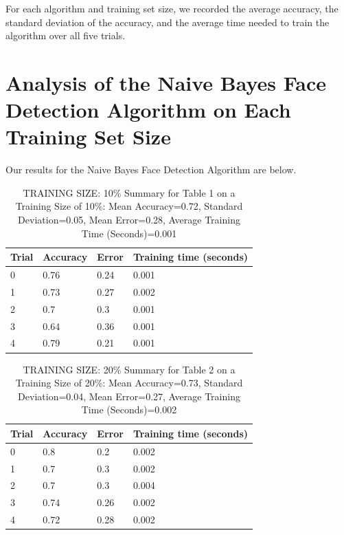 \documentclass{article}
\begin{document}
For each algorithm and training set size, we recorded the average accuracy, the standard deviation of the accuracy, and the average time needed to train the algorithm over all five trials. 



\section{Analysis of the Naive Bayes Face Detection Algorithm on Each Training Set Size}

Our results for the Naive Bayes Face Detection Algorithm are below.

\begin{table}[H]

\centering
{\begin{tabular}{||p{1cm}|p{1.8cm}|p{1.8cm}|p{3cm}||}
 \hline
Trial & Accuracy & Error & Training time (seconds) \\ [0.5ex] 
 \hline\hline
   0  & 0.76  & 0.24  & 0.001\\
\hline
   1  & 0.73  & 0.27  & 0.002\\
\hline
   2  & 0.7  & 0.3  & 0.001\\
\hline
   3  & 0.64  & 0.36  & 0.001\\
\hline
   4  & 0.79  & 0.21  & 0.001\\
 \hline
\end{tabular}}
\caption{TRAINING SIZE: 10\% \newline Summary for Table 1 on a Training Size of 10\%: Mean Accuracy=0.72, Standard Deviation=0.05, Mean Error=0.28, Average Training Time (Seconds)=0.001}
\end{table} 

\begin{table}[H]

\centering
{\begin{tabular}{||p{1cm}|p{1.8cm}|p{1.8cm}|p{3cm}||}
 \hline
Trial & Accuracy & Error & Training time (seconds) \\ [0.5ex] 
 \hline\hline
   0  & 0.8  & 0.2  & 0.002\\
\hline
   1  & 0.7  & 0.3  & 0.002\\
\hline
   2  & 0.7  & 0.3  & 0.004\\
\hline
   3  & 0.74  & 0.26  & 0.002\\
\hline
   4  & 0.72  & 0.28  & 0.002\\
 \hline
\end{tabular}}
\caption{TRAINING SIZE: 20\% \newline Summary for Table 2 on a Training Size of 20\%: Mean Accuracy=0.73, Standard Deviation=0.04, Mean Error=0.27, Average Training Time (Seconds)=0.002}
\end{table} 
\end{document}
